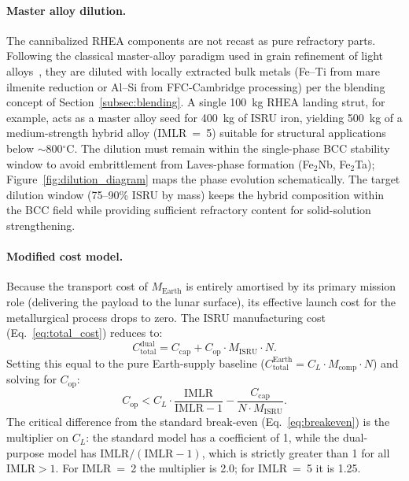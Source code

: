 \documentclass[11pt,a4paper]{article}
\begin{document}
\paragraph{Master alloy dilution.}
The cannibalized RHEA components are not recast as pure refractory parts. Following the classical master-alloy paradigm used in grain refinement of light alloys~\cite{Easton1999}, they are diluted with locally extracted bulk metals (Fe--Ti from mare ilmenite reduction or Al--Si from FFC-Cambridge processing) per the blending concept of Section~\ref{subsec:blending}. A single 100~kg RHEA landing strut, for example, acts as a master alloy seed for 400~kg of ISRU iron, yielding 500~kg of a medium-strength hybrid alloy (IMLR~=~5) suitable for structural applications below $\sim$800$^\circ$C. The dilution must remain within the single-phase BCC stability window to avoid embrittlement from Laves-phase formation (Fe$_2$Nb, Fe$_2$Ta); Figure~\ref{fig:dilution_diagram} maps the phase evolution schematically. The target dilution window (75--90\% ISRU by mass) keeps the hybrid composition within the BCC field while providing sufficient refractory content for solid-solution strengthening.

\paragraph{Modified cost model.}
Because the transport cost of $M_{\text{Earth}}$ is entirely amortised by its primary mission role (delivering the payload to the lunar surface), its effective launch cost for the metallurgical process drops to zero. The ISRU manufacturing cost (Eq.~\ref{eq:total_cost}) reduces to:
%
\begin{equation}
    C_{\text{total}}^{\text{dual}} = C_{\text{cap}} + C_{\text{op}} \cdot M_{\text{ISRU}} \cdot N.
    \label{eq:total_cost_dual}
\end{equation}
%
Setting this equal to the pure Earth-supply baseline ($C_{\text{total}}^{\text{Earth}} = C_L \cdot M_{\text{comp}} \cdot N$) and solving for $C_{\text{op}}$:
%
\begin{equation}
    C_{\text{op}} < C_L \cdot \frac{\text{IMLR}}{\text{IMLR} - 1} - \frac{C_{\text{cap}}}{N \cdot M_{\text{ISRU}}}.
    \label{eq:breakeven_dual}
\end{equation}
%
The critical difference from the standard break-even (Eq.~\ref{eq:breakeven}) is the multiplier on $C_L$: the standard model has a coefficient of 1, while the dual-purpose model has $\text{IMLR}/(\text{IMLR}-1)$, which is strictly greater than 1 for all $\text{IMLR} > 1$. For IMLR~=~2 the multiplier is 2.0; for IMLR~=~5 it is 1.25.
\end{document}
